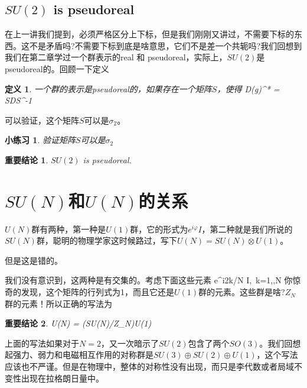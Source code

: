 \documentclass[11pt,a4paper]{ctexart}
\newtheorem{definition}{\hspace{2em} 定义}[section]
\newtheorem{conclusion}{\hspace{2em} 重要结论}[section]
\newtheorem{practice}{\hspace{2em} 小练习}[section]
\begin{document}
\subsection{$SU(2)$ is pseudoreal}
在上一讲我们提到，必须严格区分上下标，但是我们刚刚又讲过，不需要下标的东西。这不是矛盾吗?不需要下标到底是啥意思，它们不是差一个共轭吗?我们回想到我们在第二章学过一个群表示的real 和 pseudoreal，实际上，$SU(2)$是pseudoreal的。回顾一下定义
\begin{definition}
  一个群的表示是pseudoreal的，如果存在一个矩阵$S$，使得
  \beq
  D(g)^* = SDS^{-1}
  \eeq
\end{definition}
可以验证，这个矩阵$S$可以是$\sigma_2$。
\begin{practice}
  验证矩阵$S$可以是$\sigma_2$
\end{practice}
\begin{conclusion}
  $SU(2)$ is pseudoreal.
\end{conclusion}

\section{$SU(N)$和$U(N)$的关系}
$U(N)$群有两种，第一种是$U(1)$群，它的形式为$e^{i\varphi}I$，第二种就是我们所说的$SU(N)$群，聪明的物理学家这时候路过，写下$U(N) = SU(N)\otimes U(1)$。

但是这是错的。

我们没有意识到，这两种是有交集的。考虑下面这些元素
\be
e^{i2\pi k/N} I, \,\spa k=1,\cdots,N
\ee
你惊奇的发现，这个矩阵的行列式为1，而且它还是$U(1)$群的元素。这些群是啥?$Z_N$群的元素！所以正确的写法为
\begin{conclusion}
\beq
U(N) = \left(SU(N)/Z_N\right)\otimes U(1)
\eeq
\end{conclusion}
上面的写法如果对于$N=2$，又一次暗示了$SU(2)$包含了两个$SO(3)$。我们回想起强力、弱力和电磁相互作用的对称群是$SU(3)\oplus SU(2)\oplus U(1)$，这个写法应该也不严谨。但是在物理中，整体的对称性没有出现，而只是李代数或者局域不变性出现在拉格朗日量中。

%
%
\end{document}
